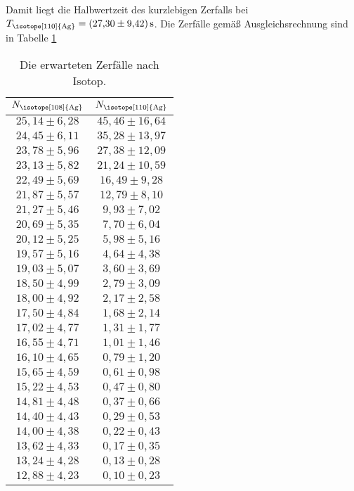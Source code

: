 Damit liegt die Halbwertzeit des kurzlebigen Zerfalls bei $T_\text{\isotope[110]{Ag}}=\qty{27.3(9.42)}{\second}$.
Die Zerfälle gemäß Ausgleichsrechnung sind in Tabelle \ref{tab:Nsi1}
\begin{table}[H]
  \centering
  \caption{Die erwarteten Zerfälle nach Isotop.}
  \label{tab:Nsi1}
  \begin{tabular}{c c}
      \toprule
      {$N_\text{\isotope[108]{Ag}}$}&{$N_\text{\isotope[110]{Ag}}$}\\
      \midrule
      $25,14 \pm 6,28$ & $45,46 \pm 16,64$ \\
      $24,45 \pm 6,11$ & $35,28 \pm 13,97$ \\
      $23,78 \pm 5,96$ & $27,38 \pm 12,09$ \\
      $23,13 \pm 5,82$ & $21,24 \pm 10,59$ \\
      $22,49 \pm 5,69$ & $16,49 \pm 9,28$ \\
      $21,87 \pm 5,57$ & $12,79 \pm 8,10$ \\
      $21,27 \pm 5,46$ & $9,93 \pm 7,02$ \\
      $20,69 \pm 5,35$ & $7,70 \pm 6,04$ \\
      $20,12 \pm 5,25$ & $5,98 \pm 5,16$ \\
      $19,57 \pm 5,16$ & $4,64 \pm 4,38$ \\
      $19,03 \pm 5,07$ & $3,60 \pm 3,69$ \\
      $18,50 \pm 4,99$ & $2,79 \pm 3,09$ \\
      $18,00 \pm 4,92$ & $2,17 \pm 2,58$ \\
      $17,50 \pm 4,84$ & $1,68 \pm 2,14$ \\
      $17,02 \pm 4,77$ & $1,31 \pm 1,77$ \\
      $16,55 \pm 4,71$ & $1,01 \pm 1,46$ \\
      $16,10 \pm 4,65$ & $0,79 \pm 1,20$ \\
      $15,65 \pm 4,59$ & $0,61 \pm 0,98$ \\
      $15,22 \pm 4,53$ & $0,47 \pm 0,80$ \\
      $14,81 \pm 4,48$ & $0,37 \pm 0,66$ \\
      $14,40 \pm 4,43$ & $0,29 \pm 0,53$ \\
      $14,00 \pm 4,38$ & $0,22 \pm 0,43$ \\
      $13,62 \pm 4,33$ & $0,17 \pm 0,35$ \\
      $13,24 \pm 4,28$ & $0,13 \pm 0,28$ \\
      $12,88 \pm 4,23$ & $0,10 \pm 0,23$ \\

\end{tabular}
\end{table}
